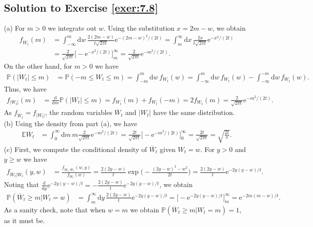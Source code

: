 \documentclass[12pt]{book}
\numberwithin{equation}{chapter}
\theoremstyle{plain}
\numberwithin{theorem}{section}
\theoremstyle{definition}
\numberwithin{exercise}{chapter}
\newcommand{\<}{\langle}
\renewcommand{\>}{\rangle}
\renewcommand{\(}{\left(}
\renewcommand{\)}{\right)}
\renewcommand{\[}{\left[}
\renewcommand{\]}{\right]}
\newcommand\Eb{\mathds{E}}
\newcommand\Pb{\mathds{P}}
\newcommand\Wb{\overline{W}}
\newcommand\dd{\mathrm{d}}
\newcommand\ee{\mathrm{e}}
\begin{document}
\subsection*{Solution to Exercise \ref{exer:7.8}}
(a) For $m > 0$ we integrate out $w$.  Using the substitution $x = 2m - w$, we obtain
\begin{align}
f_{\Wb_t}(m)
	&=	\int_{-\infty}^m \dd w \, \frac{2(2m-w)}{t \sqrt{2\pi t}} \ee^{-(2m-w)^2/(2t)} 
	=		\int_m^\infty \dd x \, \frac{2x}{t \sqrt{2\pi t}} \ee^{-x^2/(2t)} \\
	&=		\frac{2}{\sqrt{2\pi t}} \Big[ - \ee^{-x^2/(2t)} \Big]_m^\infty
	=		\frac{2}{\sqrt{2\pi t}} \ee^{-m^2/(2t)} .
\end{align}
On the other hand, for $m > 0$ we have
\begin{align}
\Pb( |W_t| \leq m )
	&=	\Pb( -m \leq W_t \leq m )
	=		\int_{-m}^m \dd w \, f_{W_t}(w) 
	=		\int_{-\infty}^m \dd w \, f_{W_t}(w) - \int_{-\infty}^{-m} \dd w \, f_{W_t}(w) . 
\end{align}
Thus, we have
\begin{align}
f_{|W_t|}(m)
	&=	\frac{\dd}{\dd m} \Pb( |W_t| \leq m )
	=		f_{W_t}(m) + f_{W_t}(-m)
	= 	2 f_{W_t}(m)
	=		\frac{2}{\sqrt{2\pi t}} \ee^{-m^2/(2t)} .
\end{align}
As $f_{\Wb_t} = f_{|W_t|}$, the random variables $\Wb_t$ and $|W_t|$ have the same distribution.
\\[0.5em]
(b) Using the density from part (a), we have
\begin{align}
\Eb \Wb_t
	&=	\int_0^\infty \dd m \, m \frac{2}{\sqrt{2\pi t}} \ee^{-m^2/(2t)}
	=		\frac{2 t}{\sqrt{2\pi t}} \Big[ - \ee^{-m^2/(2t)} \Big]_0^\infty
	=		\frac{2t}{\sqrt{2\pi t}}
	=		\sqrt{\frac{2t}{\pi}} .
\end{align}
(c) First, we compute the conditional density of $\Wb_t$ given $W_t = w$.  For $y > 0$ and $y \geq w$ we have
\begin{align}
f_{\Wb_t|W_t}(y,w)
	&=	\frac{f_{W_t,\Wb_t}(w,y)}{f_{W_t}(w)}
	=		\frac{2(2y-w)}{t} \exp \Big( - \frac{(2y-w)^2 - w^2}{2t} \Big)
	=		\frac{2(2y-w)}{t} \ee^{-2y(y-w)/t} .
\end{align}
Noting that $\frac{\dd}{\dd y} \ee^{-2y(y-w)/t} = - \frac{2(2y-w)}{t} \ee^{-2y(y-w)/t}$, we obtain
\begin{align}
\Pb( \Wb_t \geq m | W_t = w )
	&=	\int_m^\infty \dd y \, \frac{2(2y-w)}{t} \ee^{-2y(y-w)/t}
	=		\Big[ - \ee^{-2y(y-w)/t} \Big]_m^\infty
	=		\ee^{-2m(m-w)/t} .
\end{align}
As a sanity check, note that when $w = m$ we obtain $\Pb( \Wb_t \geq m | W_t = m ) = 1$, as it must be.
\end{document}
